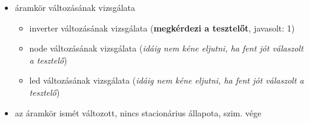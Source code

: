 {\begin{itemize}
\begin{itemize}
\begin{itemize}
\begin{itemize}
	\setlength{\itemindent}{-65pt}%
		\item led bemenetének lekérdezése (\textbf{megkérdezi a tesztelőt}, javasolt: 0)
	\end{itemize}
\end{itemize}
\item áramkör változásának vizsgálata
\begin{itemize}
\setlength{\itemsep}{0cm}%
\setlength{\parskip}{0cm}%
\setlength{\itemindent}{-50pt}%
	\item inverter változásának vizsgálata (\textbf{megkérdezi a tesztelőt}, javasolt: 1)
	\item node változásának vizsgálata (\textit{idáig nem kéne eljutni, ha fent jót válaszolt a tesztelő})
\item led változásának vizsgálata (\textit{idáig nem kéne eljutni, ha fent jót válaszolt a tesztelő})
\end{itemize}
\item az áramkör ismét változott, nincs stacionárius állapota, szim. vége
\end{itemize}
\end{itemize}
\vspace{-15pt}}

\newpage

